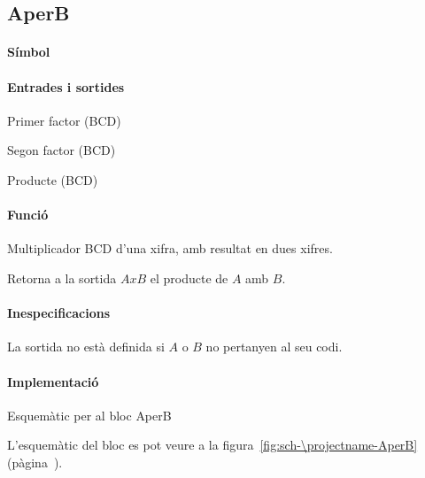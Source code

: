 \subsection{\label{sub:\projectname-AperB} \textsf{AperB}}

\paragraph{Símbol}

\begin{center}  \end{center}

\paragraph{Entrades i sortides}

\begin{where}
\item[\nodenamerange{A}{3}{0}] Primer factor (BCD)
\item[\nodenamerange{B}{3}{0}] Segon factor (BCD)
\item[\nodenamerange{AxB}{7}{0}] Producte (BCD)
\end{where}

\paragraph{Funció}

Multiplicador BCD d'una xifra, amb resultat en dues xifres.

Retorna a la sortida $AxB$ el producte de $A$ amb $B$.

\paragraph{Inespecificacions}


La sortida no està definida si $A$ o $B$ no pertanyen al seu codi.


\paragraph{Implementació}


\begin{contendfig}
  \begin{center}
  \end{center}
  \caption{\label{fig:sch-\projectname-AperB} Esquemàtic per al bloc \textsf{AperB}}
\end{contendfig}

L'esquemàtic del bloc es pot veure a la figura~\ref{fig:sch-\projectname-AperB} (pàgina~\pageref{fig:sch-\projectname-AperB}).


\vspace{1cm}

